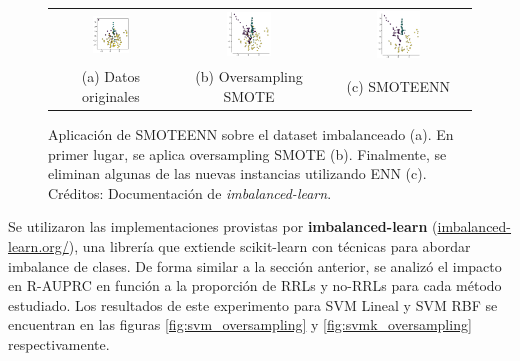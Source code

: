\begin{figure}[h!]
\begin{tabular}{ccc}
  \includegraphics[width=0.32\textwidth]{Kap7/smoteenn_1.png} & \includegraphics[width=0.32\textwidth]{Kap7/smoteenn_2.png} & 
\includegraphics[width=0.32\textwidth]{Kap7/smoteenn_3.png} \\
(a) Datos originales & (b) Oversampling SMOTE & (c) SMOTEENN
\end{tabular}
\caption{ Aplicación de SMOTEENN sobre el dataset imbalanceado (a). En primer lugar, se aplica oversampling SMOTE (b). Finalmente, se eliminan algunas de las nuevas instancias utilizando ENN (c). Créditos: Documentación de \textit{imbalanced-learn}. }
\label{fig:smoteenn}
\end{figure}


Se utilizaron las implementaciones provistas por \textbf{imbalanced-learn} (\url{imbalanced-learn.org/}), una librería que extiende scikit-learn con técnicas para abordar imbalance de clases. De forma similar a la sección anterior, se analizó el impacto en R-AUPRC en función a la proporción de RRLs y no-RRLs para cada método estudiado. Los resultados de este experimento para SVM Lineal y SVM RBF se encuentran en las figuras \ref{fig:svm_oversampling} y \ref{fig:svmk_oversampling} respectivamente.\\

